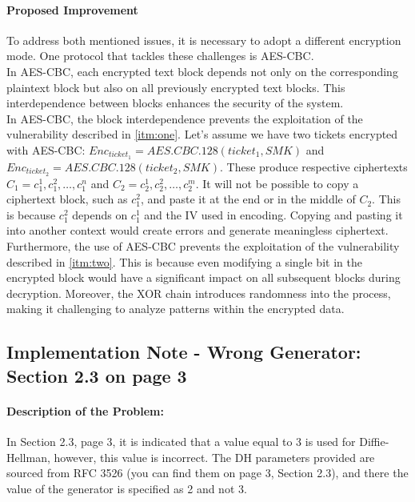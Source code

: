 \documentclass[12pt]{article}
\begin{document}
    \paragraph{Proposed Improvement}
    To address both mentioned issues, it is necessary to adopt a different encryption mode. One protocol that tackles these challenges is AES-CBC.
    \\
    In AES-CBC, each encrypted text block depends not only on the corresponding plaintext block but also on all previously encrypted text blocks. This interdependence between blocks enhances the security of the system.
    \\
    In AES-CBC, the block interdependence prevents the exploitation of the vulnerability described in \ref{itm:one}. Let's assume we have two tickets encrypted with AES-CBC: $Enc_{ticket_1} = AES.CBC.128(ticket_1, SMK)$ and $Enc_{ticket_2} = AES.CBC.128(ticket_2, SMK)$. These produce respective ciphertexts $C_1=c_1^1,c_1^2,\ldots,c_1^n$ and $C_2=c_2^1,c_2^2,\ldots,c_2^m$. It will not be possible to copy a ciphertext block, such as $c_1^2$, and paste it at the end or in the middle of $C_2$. This is because $c_1^2$ depends on $c_1^1$ and the IV used in encoding. Copying and pasting it into another context would create errors and generate meaningless ciphertext.
    \\
    Furthermore, the use of AES-CBC prevents the exploitation of the vulnerability described in \ref{itm:two}. This is because even modifying a single bit in the encrypted block would have a significant impact on all subsequent blocks during decryption. Moreover, the XOR chain introduces randomness into the process, making it challenging to analyze patterns within the encrypted data.

\subsection{Implementation Note - Wrong Generator: Section 2.3 on page 3}
    \paragraph{Description of the Problem:}
    In Section 2.3, page 3, it is indicated that a value equal to 3 is used for Diffie-Hellman, however, this value is incorrect. The DH parameters provided are sourced from RFC 3526 (you can find them on page 3, Section 2.3), and there the value of the generator is specified as 2 and not 3.
\end{document}
